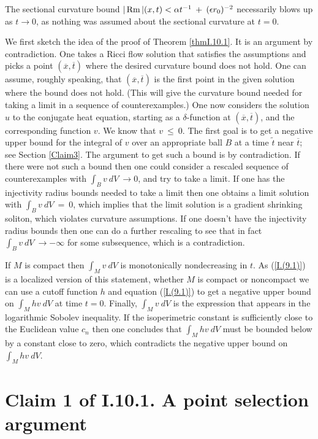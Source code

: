 The sectional curvature bound $|\operatorname{Rm}|(x,t) <
\alpha t^{-1} \: + \: (\epsilon r_0)^{-2}$ necessarily blows up
as $t \rightarrow 0$, as nothing was assumed about
the sectional curvature at $t = 0$.

We first sketch the idea of the proof of Theorem
\ref{thmI.10.1}.
It is an argument by contradiction.
One takes a Ricci flow solution that satisfies the assumptions and
picks a point $(\overline{x}, \overline{t})$ where the
desired curvature bound does not hold.  One can assume, roughly speaking,
that $(\overline{x}, \overline{t})$ is the first point in the given
solution where the bound does not hold. (This will give the curvature
bound needed for taking
a limit in a sequence of counterexamples.)  One now
considers the solution $u$ to the conjugate heat equation, starting as
a $\delta$-function at $(\overline{x}, \overline{t})$, and the
corresponding function $v$. We know that $v \: \le \: 0$. The first
goal is to get a negative upper bound for the integral of $v$ over
an appropriate ball $B$ at
a time $\widetilde{t}$ near $\overline{t}$; see Section \ref{Claim3}.
The argument to get such
a bound is by contradiction.  If there were not such a bound then one
could consider a rescaled sequence of counterexamples with
$\int_B v \: dV \: \rightarrow 0$, and try to take a
limit. If one has the injectivity radius bounds needed to take a limit
then one obtains a limit solution with
$\int_B v \: dV \: = \: 0$, which implies that the limit solution is a
gradient shrinking soliton, which violates curvature assumptions. If one
doesn't have the injectivity radius bounds
then one can do a further rescaling to see that
in fact $\int_B v \: dV \: \rightarrow -\infty$ for some subsequence,
which is a contradiction.

If $M$ is compact then
$\int_M v \: dV$ is monotonically nondecreasing in $t$.
As (\ref{I.(9.1)}) is a localized version of this statement,
whether $M$ is compact or noncompact
we can use a cutoff function $h$ and equation (\ref{I.(9.1)})
to get a negative upper bound on $\int_M h v \: dV$ at time $t = 0$.
Finally, $\int_M v \: dV$ is the expression that
appears in the
logarithmic Sobolev inequality. If the isoperimetric constant
is sufficiently close to the Euclidean value $c_n$ then one concludes
that $\int_M hv \: dV$ must be bounded below by a constant close to zero,
which contradicts the negative upper bound on $\int_M hv \: dV$.

\section{Claim 1 of I.10.1. A
point selection
argument}

